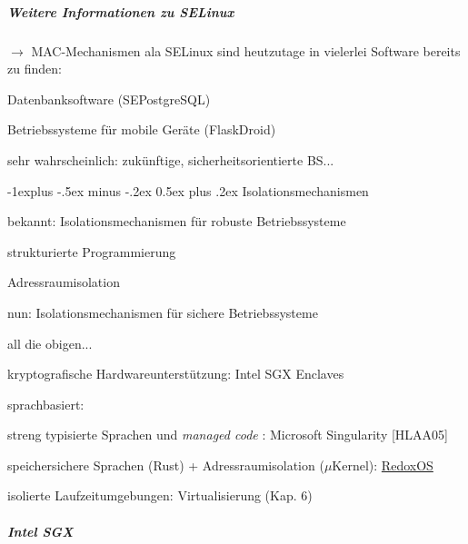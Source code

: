 \documentclass[a4paper]{article}
\makeatletter
\renewcommand{\subsection}{\@startsection{subsection}{2}{0mm}%
 {-1explus -.5ex minus -.2ex}%
 {0.5ex plus .2ex}%
 {\normalfont\normalsize\bfseries}}
\makeatother
\begin{document}
\begin{multicols}{3}
    \subparagraph{Weitere Informationen zu
        SELinux}

    $\rightarrow$ MAC-Mechanismen ala SELinux sind
    heutzutage in vielerlei Software bereits zu finden:

    \begin{itemize*}
        \item
        Datenbanksoftware (SEPostgreSQL)
        \item
        Betriebssysteme für mobile Geräte (FlaskDroid)
        \item
        sehr wahrscheinlich: zukünftige, sicherheitsorientierte BS...
    \end{itemize*}


    \subsection{Isolationsmechanismen}

    \begin{itemize*}
        \item
        bekannt: Isolationsmechanismen für robuste Betriebssysteme
        \begin{itemize*}
            \item strukturierte Programmierung
            \item Adressraumisolation
        \end{itemize*}
        \item
        nun: Isolationsmechanismen für sichere Betriebssysteme
        \begin{itemize*}
            \item all die obigen...
            \item kryptografische Hardwareunterstützung: Intel SGX Enclaves
            \item sprachbasiert: \begin{itemize*} \item streng typisierte Sprachen und \emph{managed code} : Microsoft Singularity [HLAA05] \item speichersichere Sprachen (Rust) + Adressraumisolation ($\mu$Kernel): \href{https://www.redox-os.org/}{RedoxOS} \end{itemize*}
            \item isolierte Laufzeitumgebungen: Virtualisierung (Kap. 6)
        \end{itemize*}
    \end{itemize*}


    \subparagraph{Intel SGX}


\end{multicols}
\end{document}
